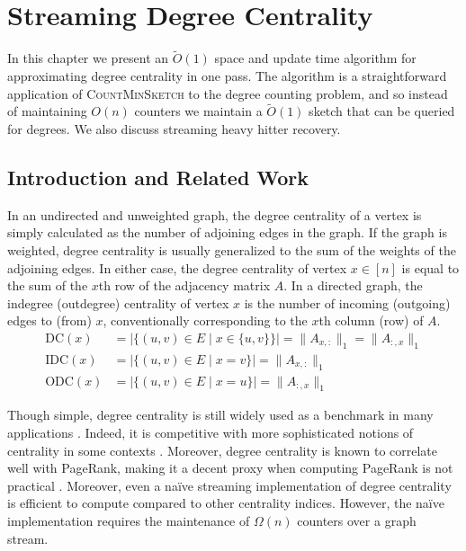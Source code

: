\documentclass{report}
\newcommand{\algoname}[1]{\textnormal{\textsc{#1}}}
\begin{document}
\chapter{Streaming Degree Centrality} \label{chap:dc}

In this chapter we present an $\widetilde{O}(1)$ space and update time algorithm for approximating degree centrality in one pass.
The algorithm is a straightforward application of \algoname{CountMinSketch} to the degree counting problem, and so instead of maintaining $O(n)$ counters we maintain a $\widetilde{O}(1)$ sketch that can be queried for degrees.
We also discuss streaming heavy hitter recovery.

\section{Introduction and Related Work} \label{dc:sec:intro}

In an undirected and unweighted graph, the degree centrality of a vertex is simply calculated as the number of adjoining edges in the graph.
If the graph is weighted, degree centrality is usually generalized to the sum of the weights of the adjoining edges. 
In either case, the degree centrality of  vertex $x \in [n]$ is equal to the sum of the $x$th row of the adjacency matrix $A$.
In a directed graph, the indegree (outdegree) centrality of vertex $x$ is the number of incoming (outgoing) edges to (from) $x$, conventionally corresponding to the $x$th column (row) of $A$.
%
\begin{align} 
\label{eq:dc}
\textrm{DC}(x) 
&= |\{(u,v) \in E \mid x \in \{u,v\} \}| 
= \| A_{x,:} \|_1 
= \| A_{:,x} \|_1 \\
\label{eq:idc}
\textrm{IDC}(x) 
&= |\{(u,v) \in E \mid x =v \}| 
= \| A_{x,:} \|_1 \\
\label{eq:odc}
\textrm{ODC}(x) 
&= |\{(u,v) \in E \mid x =u \}|
= \| A_{:,x} \|_1
\end{align}
%


Though simple, degree centrality is still widely used as a benchmark in many applications \cite{boldi2014axioms}. 
Indeed, it is competitive with more sophisticated notions of centrality in some contexts \cite{upstill2003predicting}.
Moreover, degree centrality is known to correlate well with PageRank, making it a decent proxy when computing PageRank is not practical \cite{upstill2003predicting}.
Moreover, even a na\"ive streaming implementation of degree centrality is efficient to compute compared to other centrality indices.
However, the na\"ive implementation requires the maintenance of $\Omega(n)$ counters over a graph stream. 
\end{document}
